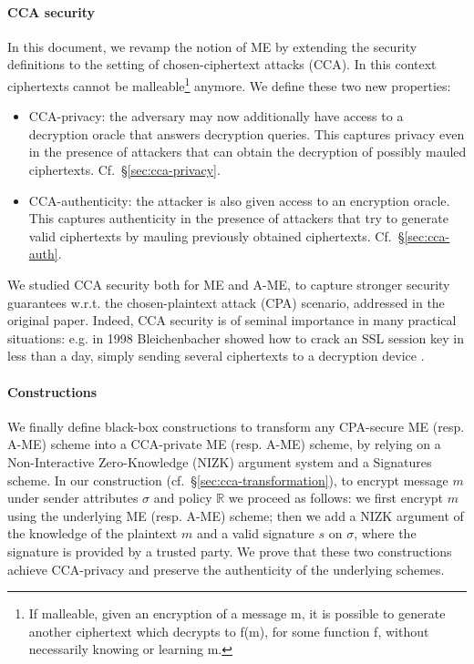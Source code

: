 \paragraph{CCA security}
In this document, we revamp the notion of ME by extending the security definitions to the setting of chosen-ciphertext attacks (CCA).
In this context ciphertexts cannot be malleable\footnote{If malleable, given an encryption of a message m, it is possible to generate another ciphertext which decrypts to f(m), for some function f, without necessarily knowing or learning m.} anymore.
\newline\newline
We define these two new properties:
\begin{itemize}
    \item CCA-privacy: the adversary may now additionally have access to a decryption oracle that answers decryption queries. This captures privacy even in the presence of attackers that can obtain the decryption of possibly mauled ciphertexts. Cf.\ \S\ref{sec:cca-privacy}.
    \item CCA-authenticity: the attacker is also given access to an encryption oracle. This captures authenticity in the presence of attackers that try to generate valid ciphertexts by mauling previously obtained ciphertexts. Cf.\ \S\ref{sec:cca-auth}.
\end{itemize}
We studied CCA security both for ME and A-ME, to capture stronger security guarantees w.r.t. the chosen-plaintext attack (CPA) scenario, addressed in the original paper.
Indeed, CCA security is of seminal importance in many practical situations: e.g. in 1998 Bleichenbacher showed how to crack an SSL session key in less than a day, simply sending several ciphertexts to a decryption device \cite{Bleichenbacher}.

\paragraph{Constructions}
We finally define black-box constructions to transform any CPA-secure ME (resp. A-ME) scheme into a CCA-private ME (resp. A-ME) scheme, by relying on a Non-Interactive Zero-Knowledge (NIZK) argument system and a Signatures scheme.
\newline\newline
In our construction (cf.\ \S\ref{sec:cca-transformation}), to encrypt message $m$ under sender attributes $\sigma$ and policy $\mathbb{R}$ we proceed as follows: we first encrypt $m$ using the underlying ME (resp. A-ME) scheme; then we add a NIZK argument of the knowledge of the plaintext $m$ and a valid signature $s$ on $\sigma$, where the signature is provided by a trusted party.
\newline
We prove that these two constructions achieve CCA-privacy and preserve the authenticity of the underlying schemes.
